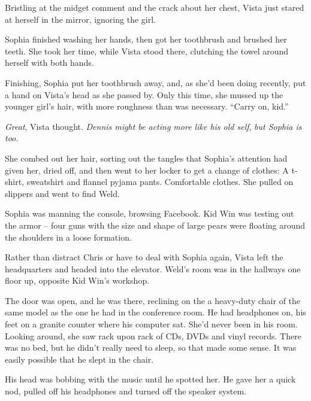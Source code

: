 Bristling at the midget comment and the crack about her chest, Vista just stared at herself in the mirror, ignoring the girl.



Sophia finished washing her hands, then got her toothbrush and brushed her teeth.  She took her time, while Vista stood there, clutching the towel around herself with both hands.



Finishing, Sophia put her toothbrush away, and, as she'd been doing recently, put a hand on Vista's head as she passed by.  Only this time, she mussed up the younger girl's hair, with more roughness than was necessary.  ``Carry on, kid.''



\emph{Great}, Vista thought.  \emph{Dennis might be acting more like his old self}, \emph{but Sophia is too.}



She combed out her hair, sorting out the tangles that Sophia's attention had given her, dried off, and then went to her locker to get a change of clothes: A t-shirt, sweatshirt and flannel pyjama pants.  Comfortable clothes.  She pulled on slippers and went to find Weld.



Sophia was manning the console, browsing Facebook.  Kid Win was testing out the armor – four guns with the size and shape of large pears were floating around the shoulders in a loose formation.



Rather than distract Chris or have to deal with Sophia again, Vista left the headquarters and headed into the elevator.  Weld's room was in the hallways one floor up, opposite Kid Win's workshop.



The door was open, and he was there, reclining on the a heavy-duty chair of the same model as the one he had in the conference room.  He had headphones on, his feet on a granite counter where his computer sat.  She'd never been in his room.  Looking around, she saw rack upon rack of CDs, DVDs and vinyl records.  There was no bed, but he didn't really need to sleep, so that made some sense.  It was easily possible that he slept in the chair.



His head was bobbing with the music until he spotted her.  He gave her a quick nod, pulled off his headphones and turned off the speaker system.



